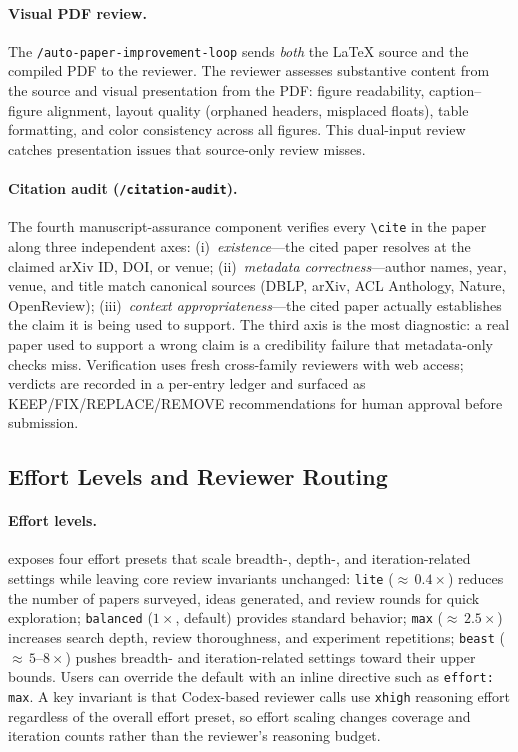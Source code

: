 \paragraph{Visual PDF review.}
The \texttt{/auto-paper-improvement-loop} sends \emph{both} the \LaTeX{} source and the compiled PDF to the reviewer.
The reviewer assesses substantive content from the source and visual presentation from the PDF: figure readability, caption--figure alignment, layout quality (orphaned headers, misplaced floats), table formatting, and color consistency across all figures.
This dual-input review catches presentation issues that source-only review misses.

\paragraph{Citation audit (\texttt{/citation-audit}).}
The fourth manuscript-assurance component verifies every \texttt{\textbackslash cite} in the paper along three independent axes:
(i)~\emph{existence}---the cited paper resolves at the claimed arXiv ID, DOI, or venue;
(ii)~\emph{metadata correctness}---author names, year, venue, and title match canonical sources (DBLP, arXiv, ACL Anthology, Nature, OpenReview);
(iii)~\emph{context appropriateness}---the cited paper actually establishes the claim it is being used to support.
The third axis is the most diagnostic: a real paper used to support a wrong claim is a credibility failure that metadata-only checks miss.
Verification uses fresh cross-family reviewers with web access; verdicts are recorded in a per-entry ledger and surfaced as KEEP/FIX/REPLACE/REMOVE recommendations for human approval before submission.

\subsection{Effort Levels and Reviewer Routing}
\label{sec:effort}

\paragraph{Effort levels.}
\aris{} exposes four effort presets that scale breadth-, depth-, and iteration-related settings while leaving core review invariants unchanged:
\texttt{lite} (${\approx}\,0.4\times$) reduces the number of papers surveyed, ideas generated, and review rounds for quick exploration;
\texttt{balanced} ($1\times$, default) provides standard behavior;
\texttt{max} (${\approx}\,2.5\times$) increases search depth, review thoroughness, and experiment repetitions;
\texttt{beast} (${\approx}\,5$--$8\times$) pushes breadth- and iteration-related settings toward their upper bounds.
Users can override the default with an inline directive such as \texttt{effort: max}.
A key invariant is that Codex-based reviewer calls use \texttt{xhigh} reasoning effort regardless of the overall effort preset, so effort scaling changes coverage and iteration counts rather than the reviewer's reasoning budget.

